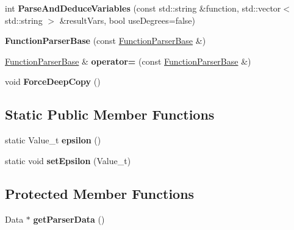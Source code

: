 \begin{DoxyCompactItemize}
\item 
\mbox{\label{class_function_parser_base_acb8b8d6665d3e3a14e2ffb87b7b92333}} 
int {\bfseries Parse\+And\+Deduce\+Variables} (const std\+::string \&function, std\+::vector$<$ std\+::string $>$ \&result\+Vars, bool use\+Degrees=false)
\item 
\mbox{\label{class_function_parser_base_a7e61e394eabcf0986e12fa74345b10b9}} 
{\bfseries Function\+Parser\+Base} (const \hyperlink{class_function_parser_base}{Function\+Parser\+Base} \&)
\item 
\mbox{\label{class_function_parser_base_abf49ad6d28419f75eee77fa5b71defcd}} 
\hyperlink{class_function_parser_base}{Function\+Parser\+Base} \& {\bfseries operator=} (const \hyperlink{class_function_parser_base}{Function\+Parser\+Base} \&)
\item 
\mbox{\label{class_function_parser_base_a27aa76aa3a554b9210d761c1add2172b}} 
void {\bfseries Force\+Deep\+Copy} ()
\end{DoxyCompactItemize}
\subsection*{Static Public Member Functions}
\begin{DoxyCompactItemize}
\item 
\mbox{\label{class_function_parser_base_a4e45e8962c27cbc0ec62d0a6f9a75cac}} 
static Value\+\_\+t {\bfseries epsilon} ()
\item 
\mbox{\label{class_function_parser_base_a694aea0bfb61cd324a753b917f906406}} 
static void {\bfseries set\+Epsilon} (Value\+\_\+t)
\end{DoxyCompactItemize}
\subsection*{Protected Member Functions}
\begin{DoxyCompactItemize}
\item 
\mbox{\label{class_function_parser_base_a77ea4e232ccb5aca661597f72dc37c84}} 
Data $\ast$ {\bfseries get\+Parser\+Data} ()
\end{DoxyCompactItemize}
